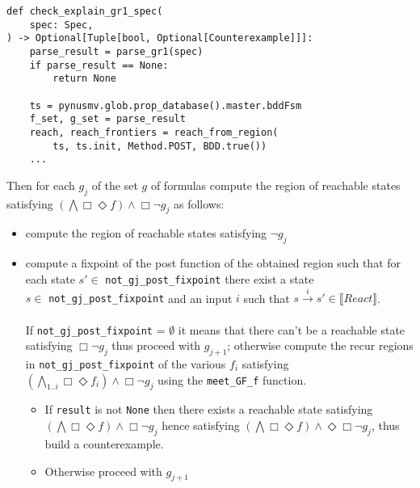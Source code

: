 \documentclass[11pt]{article}
\newcommand{\minline}[1]{{\footnotesize \texttt{#1}}}
\begin{document}
\begin{verbatim}
def check_explain_gr1_spec(
    spec: Spec,
) -> Optional[Tuple[bool, Optional[Counterexample]]]:
    parse_result = parse_gr1(spec)
    if parse_result == None:
        return None

    ts = pynusmv.glob.prop_database().master.bddFsm
    f_set, g_set = parse_result
    reach, reach_frontiers = reach_from_region(
        ts, ts.init, Method.POST, BDD.true())
    ...
\end{verbatim}

Then for each $g_j$ of the set $g$ of formulas compute the region of
reachable states satisfying
$ \left(\bigwedge \Box\Diamond f \right) \wedge
	\Box \neg g_j$
as follows:
\begin{itemize}
	\item compute the region of reachable states satisfying $\neg g_j$
	\item compute a fixpoint of the post function of the obtained region such
	      that for each state $s' \in$ \minline{not_gj_post_fixpoint} there
	      exist a state\\
	      $s \in$ \minline{not_gj_post_fixpoint} and an input $i$ such that
	      $s \overset{i}{\to} s' \in \llbracket React\rrbracket$.\\ \\
	      If \minline{not_gj_post_fixpoint} = $\emptyset$ it means
	      that there can't be a reachable state satisfying
	      $ \Box \neg g_j $
	      thus proceed with $g_{j+1}$; otherwise compute the recur regions in
	      \minline{not_gj_post_fixpoint} of the various $f_i$ satisfying
	      $ \left(\bigwedge_{1..i} \Box\Diamond f_i \right) \wedge
		      \Box \neg g_j $
	      using the \minline{meet_GF_f} function.
	      \begin{itemize}
		      \item If \minline{result} is not \minline{None} then there exists a
		            reachable state satisfying
		            $ \left(\bigwedge \Box\Diamond f \right) \wedge
			            \Box \neg g_j $ hence satisfying
		            $ \left(\bigwedge \Box\Diamond f \right) \wedge
			            \Diamond\Box \neg g_j $, thus build a counterexample.
		      \item Otherwise proceed with $g_{j+1}$
	      \end{itemize}


\end{itemize}
\end{document}
